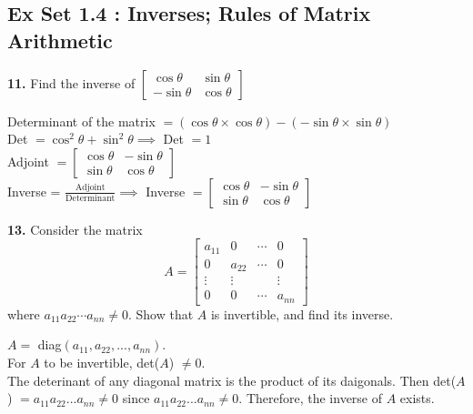 \documentclass[addpoints]{exam}
\begin{document}
\subsection*{\textbf{Ex Set 1.4 : Inverses; Rules of Matrix Arithmetic}}
\begin{questions}
    \question
    \textbf{11. } Find the inverse of $ \begin{bmatrix}
        \cos\theta & \sin\theta \\ 
        -\sin\theta & \cos\theta
    \end{bmatrix} $
    \begin{solution}
        Determinant of the matrix $ = (\cos\theta \times \cos\theta) - (-\sin\theta \times \sin\theta)$ \\ 
        Det $ = \cos^2\theta + \sin^2\theta \implies $ Det $ = 1 $ \\ 
        Adjoint $ = \begin{bmatrix}
            \cos\theta & -\sin\theta \\ 
            \sin\theta & \cos\theta
        \end{bmatrix} $ \\  
        Inverse = $ \frac{\text{Adjoint}}{\text{Determinant}} \implies $ Inverse $ = \begin{bmatrix}
            \cos\theta & -\sin\theta \\ 
            \sin\theta & \cos\theta
        \end{bmatrix} $
    \end{solution}

    \question
    \textbf{13. } Consider the matrix $$ A = \begin{bmatrix}
        a_{11} & 0 & \cdots & 0 \\ 
        0 & a_{22} & \cdots & 0 \\
        \vdots & \vdots & & \vdots \\ 
        0 & 0 & \cdots & a_{nn}
    \end{bmatrix} $$
    where $ a_{11}a_{22}\cdots a_{nn} \neq 0 $. Show that $A$ is invertible, and find its inverse.
    \begin{solution}
        $A = $ diag$ (a_{11}, a_{22}, ..., a_{nn}) $. \\ 
        For $A$ to be invertible, det($A$) $ \neq 0 $. \\ 
        The deterinant of any diagonal matrix is the product of its daigonals. Then det($A$) $ = a_{11}a_{22}...a_{nn} \neq 0 $ since $ a_{11}a_{22}...a_{nn} \neq 0 $. Therefore, the inverse of $A$ exists. 
        

\end{solution}
\end{questions}
\end{document}
